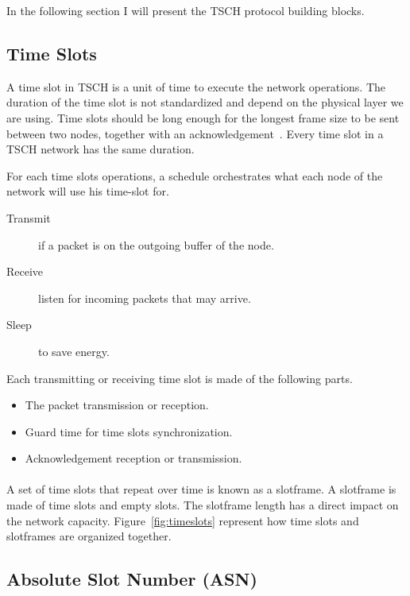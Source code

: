 In the following section I will present the TSCH protocol building blocks.

\subsection{Time Slots}

A time slot in TSCH is a unit of time to execute the network operations. 
The duration of the time slot is not standardized and depend on the physical 
layer we are using. 
Time slots should be long enough for the longest frame size to be sent
between two nodes, together with an acknowledgement~\cite{rfc7554}. 
Every time slot in a TSCH network has the same duration.

For each time slots operations, a schedule orchestrates what each
node of the network will use his time-slot for.

\begin{description}
  \item [Transmit] if a packet is on the outgoing buffer of the node.
  \item [Receive] listen for incoming packets that may arrive.
  \item [Sleep] to save energy.
\end{description}

Each transmitting or receiving time slot is made of the following parts.

\begin{itemize}
  \item The packet transmission or reception.
  \item Guard time for time slots synchronization.
  \item Acknowledgement reception or transmission.
\end{itemize}

\paragraph{}

A set of time slots that repeat over time is known as a slotframe.
A slotframe is made of time slots and empty slots.
The slotframe length has a direct impact on the network capacity.
Figure~\ref{fig:timeslots} represent how time slots and slotframes are
organized together. 



\subsection{Absolute Slot Number (ASN)}

